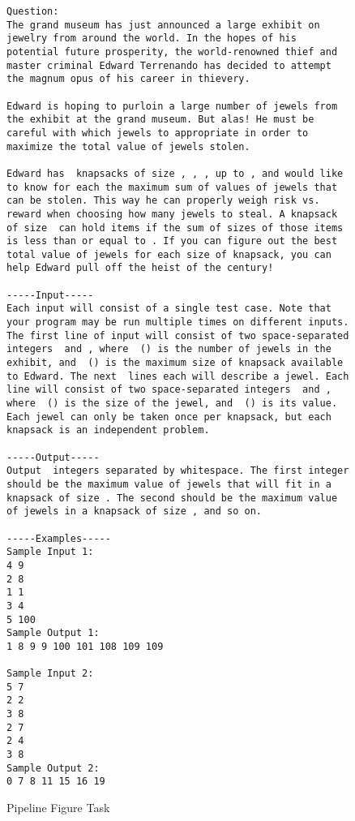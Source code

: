 \begin{figure}[h]
\begin{lstlisting}
Question:
The grand museum has just announced a large exhibit on jewelry from around the world. In the hopes of his potential future prosperity, the world-renowned thief and master criminal Edward Terrenando has decided to attempt the magnum opus of his career in thievery.

Edward is hoping to purloin a large number of jewels from the exhibit at the grand museum. But alas! He must be careful with which jewels to appropriate in order to maximize the total value of jewels stolen.

Edward has  knapsacks of size , , , up to , and would like to know for each the maximum sum of values of jewels that can be stolen. This way he can properly weigh risk vs. reward when choosing how many jewels to steal. A knapsack of size  can hold items if the sum of sizes of those items is less than or equal to . If you can figure out the best total value of jewels for each size of knapsack, you can help Edward pull off the heist of the century!

-----Input-----
Each input will consist of a single test case. Note that your program may be run multiple times on different inputs. The first line of input will consist of two space-separated integers  and , where  () is the number of jewels in the exhibit, and  () is the maximum size of knapsack available to Edward. The next  lines each will describe a jewel. Each line will consist of two space-separated integers  and , where  () is the size of the jewel, and  () is its value. Each jewel can only be taken once per knapsack, but each knapsack is an independent problem.

-----Output-----
Output  integers separated by whitespace. The first integer should be the maximum value of jewels that will fit in a knapsack of size . The second should be the maximum value of jewels in a knapsack of size , and so on.

-----Examples-----
Sample Input 1:
4 9
2 8
1 1
3 4
5 100
Sample Output 1:
1 8 9 9 100 101 108 109 109

Sample Input 2:
5 7
2 2
3 8
2 7
2 4
3 8
Sample Output 2:
0 7 8 11 15 16 19
\end{lstlisting}
\caption{Pipeline Figure Task}
\end{figure}


